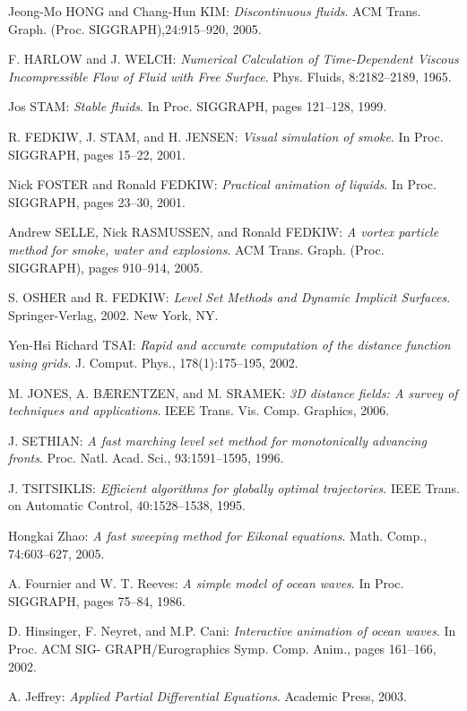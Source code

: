 \documentclass[11pt]{report}
\begin{document}
\newpage
\begin{thebibliography}{2}
Jeong-Mo HONG and Chang-Hun KIM:
\textit{Discontinuous fluids}.
ACM Trans. Graph. (Proc. SIGGRAPH),24:915–920, 2005.

F. HARLOW and J. WELCH:
\textit{Numerical Calculation of Time-Dependent Viscous Incompressible Flow of
Fluid with Free Surface}.
Phys. Fluids, 8:2182–2189, 1965.

Jos STAM:
\textit{Stable fluids}.
In Proc. SIGGRAPH, pages 121–128, 1999.

R. FEDKIW, J. STAM, and H. JENSEN:
\textit{Visual simulation of smoke}.
In Proc. SIGGRAPH, pages 15–22, 2001.

Nick FOSTER and Ronald FEDKIW:
\textit{Practical animation of liquids}.
In Proc. SIGGRAPH, pages 23–30, 2001.

Andrew SELLE, Nick RASMUSSEN, and Ronald FEDKIW:
\textit{A vortex particle method for smoke, water and explosions}.
ACM Trans. Graph. (Proc. SIGGRAPH), pages 910–914, 2005.

S. OSHER and R. FEDKIW:
\textit{Level Set Methods and Dynamic Implicit Surfaces}.
Springer-Verlag, 2002. New York, NY.

Yen-Hsi Richard TSAI:
\textit{Rapid and accurate computation of the distance function using grids}.
J. Comput. Phys., 178(1):175–195, 2002.

M. JONES, A. B\AE RENTZEN, and M. SRAMEK:
\textit{3D distance fields: A survey of techniques and applications}.
IEEE Trans. Vis. Comp. Graphics, 2006.

J. SETHIAN:
\textit{A fast marching level set method for monotonically advancing fronts}.
Proc. Natl. Acad. Sci., 93:1591–1595, 1996.

J. TSITSIKLIS:
\textit{Efficient algorithms for globally optimal trajectories}.
IEEE Trans. on Automatic Control, 40:1528–1538, 1995.

Hongkai Zhao:
\textit{A fast sweeping method for Eikonal equations}.
Math. Comp., 74:603–627, 2005.

A. Fournier and W. T. Reeves:
\textit{A simple model of ocean waves}. In Proc. SIGGRAPH, pages 75–84, 1986.

D. Hinsinger, F. Neyret, and M.P. Cani:
\textit{Interactive animation of ocean waves}. In Proc. ACM SIG-
GRAPH/Eurographics Symp. Comp. Anim., pages 161–166, 2002.

A. Jeffrey:
\textit{Applied Partial Differential Equations}. Academic Press, 2003.


\end{thebibliography}
\end{document}
